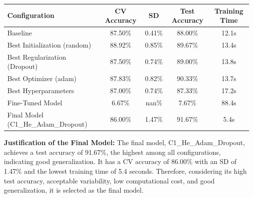 \documentclass[10pt]{article}
\begin{document}
\begin{center}

\begin{tabular}{|l|c|c|c|c|}

\hline

Configuration & CV Accuracy & SD & Test Accuracy & Training Time\\

\hline

Baseline & 87.50\% & 0.41\% & 88.00\% & 12.1s\\

Best Initialization (random) & 88.92\% & 0.85\% & 89.67\% & 13.4s\\

Best Regularization (Dropout) & 87.50\% & 0.74\% & 89.00\% & 13.8s\\

Best Optimizer (adam) & 87.83\% & 0.82\% & 90.33\% & 13.7s\\

Best Hyperparameters & 87.00\% & 0.74\% & 87.33\% & 17.2s\\

Fine-Tuned Model & 6.67\% & nan\% & 7.67\% & 88.4s\\

Final Model (C1\_He\_Adam\_Dropout) & 86.00\% & 1.47\% & 91.67\% & 5.4s\\

\hline

\end{tabular}

\end{center}

\textbf{Justification of the Final Model:} The final model, C1\_He\_Adam\_Dropout, achieves a test accuracy of 91.67\%, the highest among all configurations, indicating good generalization. It has a CV accuracy of 86.00\% with an SD of 1.47\% and the lowest training time of 5.4 seconds. Therefore, considering its high test accuracy, acceptable variability, low computational cost, and good generalization, it is selected as the final model.
\end{document}
